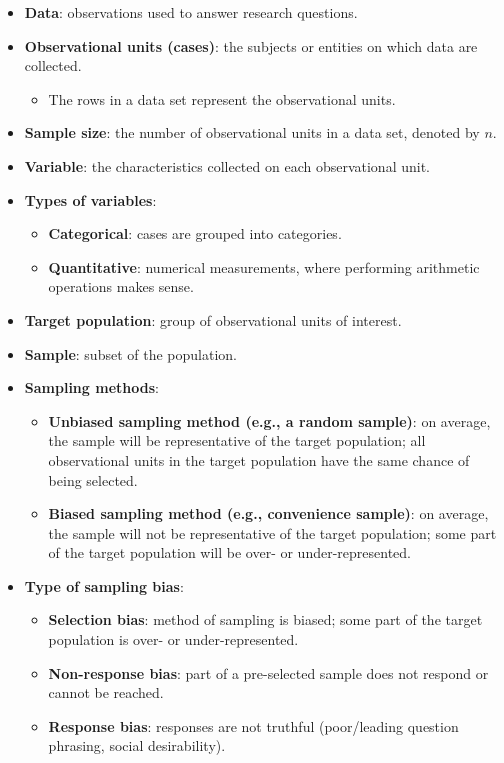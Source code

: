 \documentclass[
]{report}
\providecommand{\tightlist}{%
  \setlength{\itemsep}{0pt}\setlength{\parskip}{0pt}}
\begin{document}
\begin{itemize}
\item
  \textbf{Data}: observations used to answer research questions.
\item
  \textbf{Observational units (cases)}: the subjects or entities on which data are collected.

  \begin{itemize}
  \tightlist
  \item
    The rows in a data set represent the observational units.
  \end{itemize}
\item
  \textbf{Sample size}: the number of observational units in a data set, denoted by \(n\).
\item
  \textbf{Variable}: the characteristics collected on each observational unit.
\item
  \textbf{Types of variables}:

  \begin{itemize}
  \item
    \textbf{Categorical}: cases are grouped into categories.
  \item
    \textbf{Quantitative}: numerical measurements, where performing arithmetic operations makes sense.
  \end{itemize}
\item
  \textbf{Target population}: group of observational units of interest.
\item
  \textbf{Sample}: subset of the population.
\item
  \textbf{Sampling methods}:

  \begin{itemize}
  \item
    \textbf{Unbiased sampling method (e.g., a random sample)}: on average, the sample will be representative of the target population; all observational units in the target population have the same chance of being selected.
  \item
    \textbf{Biased sampling method (e.g., convenience sample)}: on average, the sample will not be representative of the target population; some part of the target population will be over- or under-represented.
  \end{itemize}
\item
  \textbf{Type of sampling bias}:

  \begin{itemize}
  \item
    \textbf{Selection bias}: method of sampling is biased; some part of the target population is over- or under-represented.
  \item
    \textbf{Non-response bias}: part of a pre-selected sample does not respond or cannot be reached.
  \item
    \textbf{Response bias}: responses are not truthful (poor/leading question phrasing, social desirability).
  \end{itemize}
\end{itemize}
\end{document}
